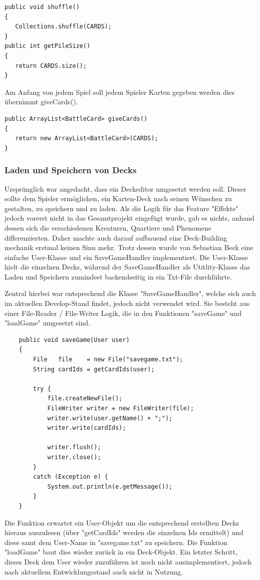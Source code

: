 \begin{lstlisting}
public void shuffle()
{
   Collections.shuffle(CARDS);
}
public int getPileSize()
{
   return CARDS.size();
}
\end{lstlisting}

Am Anfang von jedem Spiel soll jedem Spieler Karten gegeben werden dies übernimmt giveCards().

\begin{lstlisting}
public ArrayList<BattleCard> giveCards()
{
   return new ArrayList<BattleCard>(CARDS);
}
\end{lstlisting}

\subsubsection{Laden und Speichern von Decks}
Ursprünglich war angedacht, dass ein Deckeditor umgesetzt werden soll. Dieser sollte dem Spieler ermöglichen, ein Karten-Deck nach seinen Wünschen zu gestalten, zu speichern und zu laden.  Als die Logik für das Feature "Effekte" jedoch vorerst nicht in das Gesamtprojekt eingefügt wurde, gab es nichts, anhand dessen sich die verschiedenen Kreaturen, Quartiere und Phenomene differenzierten. Daher machte auch darauf aufbauend eine Deck-Building mechanik erstmal keinen Sinn mehr. Trotz dessen wurde von Sebastian Beck eine einfache User-Klasse und ein SaveGameHandler implementiert. Die User-Klasse hielt die einzelnen Decks, während der SaveGameHandler als Utitlity-Klasse das Laden und Speichern zumindest backendseitig in ein Txt-File durchführte.

Zentral hierbei war entsprechend die Klasse "SaveGameHandler", welche sich auch im aktuellen Develop-Stand findet, jedoch nicht verwendet wird. 
Sie besteht aus einer File-Reader / File-Writer Logik, die in den Funktionen "saveGame" und "loadGame" umgesetzt sind. 
\begin{lstlisting}
	public void saveGame(User user)
	{
		File   file    = new File("savegame.txt");
		String cardIds = getCardIds(user);

		try {
			file.createNewFile();
			FileWriter writer = new FileWriter(file);
			writer.write(user.getName() + ";");
			writer.write(cardIds);

			writer.flush();
			writer.close();
		}
		catch (Exception e) {
			System.out.println(e.getMessage());
		}
	}
\end{lstlisting}
Die Funktion erwartet ein User-Objekt um die entsprechend erstellten Decks hieraus auszulesen (über "getCardIds" werden die einzelnen Ids ermittelt) und diese samt dem User-Name in "savegame.txt" zu speichern.  Die Funktion "loadGame" baut dies wieder zurück in ein Deck-Objekt. Ein letzter Schritt, dieses Deck dem User wieder zuzuführen ist noch nicht ausimplementiert, jedoch nach aktuellem Entwicklungsstand auch nicht in Nutzung. 
